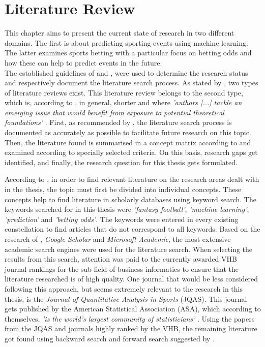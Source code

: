 \chapter{Literature Review}
This chapter aims to present the current state of research in two different domains. The first is about predicting sporting events using machine learning. The latter examines sports betting with a particular focus on betting odds and how these can help to predict events in the future. \\
\indent The established guidelines of \cite{vom_brocke_standing_2015} and \cite{webster_guest_2002}, were used to determine the research status and respectively document the literature search process. As stated by \citeauthor{webster_guest_2002}, two types of literature reviews exist. This literature review belongs to the second type, which is, according to \citeauthor{webster_guest_2002}, in general, shorter and where \emph{'authors [...] tackle an emerging issue that would benefit from exposure to potential theoretical foundations'} \parencite[, p. 14]{webster_guest_2002}. First, as recommended by \citeauthor{vom_brocke_standing_2015}, the literature search process is documented as accurately as possible to facilitate future research on this topic. Then, the literature found is summarised in a concept matrix according to \citeauthor{webster_guest_2002} and examined according to specially selected criteria. On this basis, research gaps get identified, and finally, the research question for this thesis gets formulated.

According to \citeauthor{vom_brocke_standing_2015}, in order to find relevant literature on the research areas dealt with in the thesis, the topic must first be divided into individual concepts. These concepts help to find literature in scholarly databases using keyword search. The keywords searched for in this thesis were \emph{'fantasy football'}, \emph{'machine learning'}, \emph{'prediction'} and \emph{'betting odds'}. The keywords were entered in every existing constellation to find articles that do not correspond to all keywords. Based on the research of \cite{gusenbauer_google_2019}, \emph{Google Scholar} and \emph{Microsoft Academic}, the most extensive academic search engines were used for the literature search. When selecting the results from this search, attention was paid to the currently awarded VHB journal rankings \parencite[see][]{vhb_e_v_vhb-jourqual3_2015} for the sub-field of business informatics to ensure that the literature researched is of high quality. One journal that would be less considered following this approach, but seems extremely relevant to the research in this thesis, is the \emph{Journal of Quantitative Analysis in Sports} (JQAS). This journal gets published by the American Statistical Association (ASA), which according to themselves, \emph{'is the world's largest community of statisticians'} \parencite[see][]{noauthor_about_nodate}. Using the papers from the JQAS and journals highly ranked by the VHB, the remaining literature got found using backward search and forward search suggested by \citeauthor{webster_guest_2002}.

